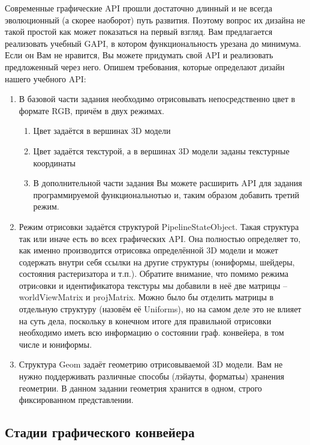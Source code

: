 \documentclass[12pt,subf,href,colorlinks=true]{article}
\begin{document}
Современные графические API прошли достаточно длинный и не всегда эволюционный (а скорее наоборот) путь развития. Поэтому вопрос их дизайна не такой простой как может показаться на первый взгляд. Вам предлагается реализовать учебный GAPI, в котором функциональность урезана до минимума. Если он Вам не нравится, Вы можете придумать свой API и реализовать предложенный через него. Опишем требования, которые определают дизайн нашего учебного API:

\begin{enumerate}
\item В базовой части задания необходимо отрисовывать непосредственно цвет в формате RGB, причём в двух режимах.
\begin{enumerate}
\item Цвет задаётся в вершинах 3D модели
\item Цвет задаётся текстурой, а в вершинах 3D модели заданы текстурные координаты
\item В дополнительной части задания Вы можете расширить API для задания программируемой функциональнотью и, таким образом добавить третий режим.
\end{enumerate}

\item Режим отрисовки задаётся структурой PipelineStateObject. Такая структура так или иначе есть во всех графических API. Она полностью определяет то, как именно производится отрисовка определённой 3D модели и может содержать внутри себя ссылки на другие структуры (юниформы, шейдеры, состояния растеризатора и т.п.). Обратите внимание, что помимо режима отриcовки и идентификатора текстуры мы добавили в неё две матрицы -- worldViewMatrix и projMatrix. Можно было бы отделить матрицы в отдельную структуру (назовём её Uniforms), но на самом деле это не влияет на суть дела, поскольку в конечном итоге для правильной отрисовки необходимо иметь всю информацию о состоянии граф. конвейера, в том числе и юниформы.

\item Структура Geom задаёт геометрию отрисовываемой 3D модели. Вам не нужно поддерживать различные способы (лэйауты, форматьы) хранения геометрии. В данном задании геометрия хранится в одном, строго фиксированном представлении.

\end{enumerate}

\subsection{Стадии графического конвейера}
\end{document}

